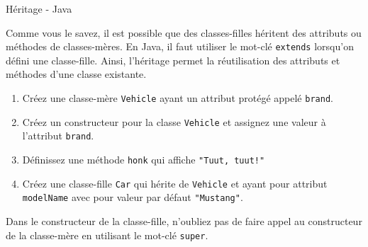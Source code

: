 	
\begin{Exercice}[10 minutes]{Héritage - Java}

	Comme vous le savez, il est possible que des classes-filles héritent des attributs ou méthodes de classes-mères.
	En Java, il faut utiliser le mot-clé \lstinline{extends} lorsqu'on défini une classe-fille. Ainsi, l'héritage permet la réutilisation des attributs et méthodes d'une classe existante.

	\begin{enumerate}
		\item Créez une classe-mère \lstinline{Vehicle} ayant un attribut protégé appelé \lstinline{brand}.
		\item Créez un constructeur pour la classe \lstinline{Vehicle} et assignez une valeur à l'attribut \lstinline{brand}.
		\item Définissez une méthode \lstinline{honk} qui affiche \lstinline{"Tuut, tuut!"}
		\item Créez une classe-fille \lstinline{Car} qui hérite de \lstinline{Vehicle} et ayant pour attribut \lstinline{modelName} avec pour valeur par défaut \lstinline{"Mustang"}.
	\end{enumerate}

	\begin{conseil}
		Dans le constructeur de la classe-fille, n'oubliez pas de faire appel au constructeur de la classe-mère en utilisant le mot-clé \lstinline{super}.
	\end{conseil}	
	
	\begin{solution}
		 
	\end{solution}
\end{Exercice}


